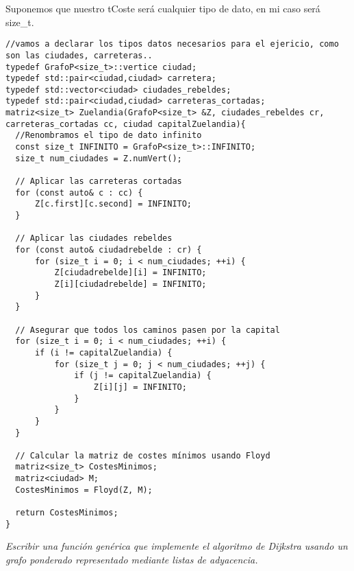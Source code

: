 Suponemos que nuestro tCoste será cualquier tipo de dato, en mi caso será size\_t.
\begin{verbatim}
//vamos a declarar los tipos datos necesarios para el ejericio, como son las ciudades, carreteras..
typedef GrafoP<size_t>::vertice ciudad;
typedef std::pair<ciudad,ciudad> carretera;
typedef std::vector<ciudad> ciudades_rebeldes;
typedef std::pair<ciudad,ciudad> carreteras_cortadas;
matriz<size_t> Zuelandia(GrafoP<size_t> &Z, ciudades_rebeldes cr, carreteras_cortadas cc, ciudad capitalZuelandia){
  //Renombramos el tipo de dato infinito
  const size_t INFINITO = GrafoP<size_t>::INFINITO;
  size_t num_ciudades = Z.numVert();

  // Aplicar las carreteras cortadas
  for (const auto& c : cc) {
      Z[c.first][c.second] = INFINITO;
  }

  // Aplicar las ciudades rebeldes
  for (const auto& ciudadrebelde : cr) {
      for (size_t i = 0; i < num_ciudades; ++i) {
          Z[ciudadrebelde][i] = INFINITO;
          Z[i][ciudadrebelde] = INFINITO;
      }
  }

  // Asegurar que todos los caminos pasen por la capital
  for (size_t i = 0; i < num_ciudades; ++i) {
      if (i != capitalZuelandia) {
          for (size_t j = 0; j < num_ciudades; ++j) {
              if (j != capitalZuelandia) {
                  Z[i][j] = INFINITO;
              }
          }
      }
  }

  // Calcular la matriz de costes mínimos usando Floyd
  matriz<size_t> CostesMinimos;
  matriz<ciudad> M;
  CostesMinimos = Floyd(Z, M);

  return CostesMinimos;
}
\end{verbatim}

\textbf{\large{}}\textit{ Escribir una función genérica que implemente el algoritmo de Dijkstra usando un grafo ponderado representado mediante listas de adyacencia.}


